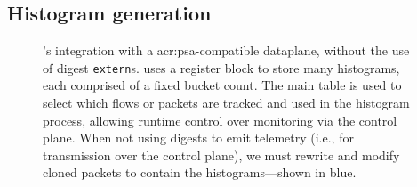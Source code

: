 \subsection{Histogram generation}

\begin{figure}
    \centering
    \caption[\seidr{}'s integration with a PSA-compatible dataplane.]{\seidr{}'s integration with a \gls{acr:psa}-compatible dataplane, without the use of digest \texttt{extern}s. \seidr{} uses a register block to store many histograms, each comprised of a fixed bucket count. The main \seidr{} table is used to select which flows or packets are tracked and used in the histogram process, allowing runtime control over monitoring via the control plane. When not using digests to emit telemetry (i.e., for transmission over the control plane), we must rewrite and modify cloned packets to contain the histograms---shown in blue.}
    \label{fig:arch}
\end{figure}

